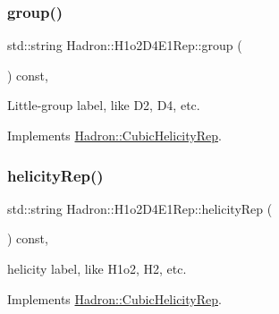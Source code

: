 \mbox{\label{structHadron_1_1H1o2D4E1Rep_a450bf31aa04b582fae7cf5cdb6c987f7}} 
\subsubsection{\texorpdfstring{group()}{group()}\hspace{0.1cm}{\footnotesize\ttfamily [5/5]}}
{\footnotesize\ttfamily std\+::string Hadron\+::\+H1o2\+D4\+E1\+Rep\+::group (\begin{DoxyParamCaption}{ }\end{DoxyParamCaption}) const\hspace{0.3cm}{\ttfamily [inline]}, {\ttfamily [virtual]}}

Little-\/group label, like D2, D4, etc. 

Implements \mbox{\hyperlink{structHadron_1_1CubicHelicityRep_a101a7d76cd8ccdad0f272db44b766113}{Hadron\+::\+Cubic\+Helicity\+Rep}}.

\mbox{\label{structHadron_1_1H1o2D4E1Rep_a0cd96ec9108f20afcba53d3bce1540fc}} 
\subsubsection{\texorpdfstring{helicityRep()}{helicityRep()}\hspace{0.1cm}{\footnotesize\ttfamily [1/3]}}
{\footnotesize\ttfamily std\+::string Hadron\+::\+H1o2\+D4\+E1\+Rep\+::helicity\+Rep (\begin{DoxyParamCaption}{ }\end{DoxyParamCaption}) const\hspace{0.3cm}{\ttfamily [inline]}, {\ttfamily [virtual]}}

helicity label, like H1o2, H2, etc. 

Implements \mbox{\hyperlink{structHadron_1_1CubicHelicityRep_af1096946b7470edf0a55451cc662f231}{Hadron\+::\+Cubic\+Helicity\+Rep}}.

\mbox{\label{structHadron_1_1H1o2D4E1Rep_a0cd96ec9108f20afcba53d3bce1540fc}} 
